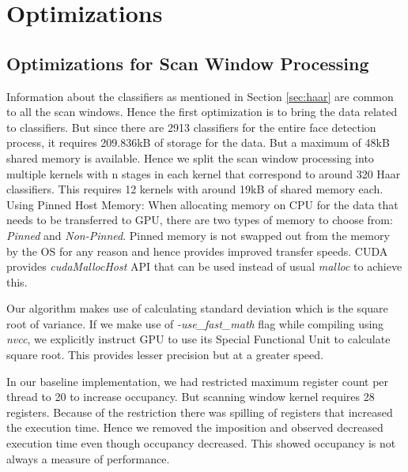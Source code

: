 \section{Optimizations}\label{sec:optim}

\subsection{Optimizations for Scan Window Processing}
\begin{itemize}

Information about the classifiers as mentioned in Section
\ref{sec:haar} are common to all the scan windows. Hence the first optimization 
is to bring the data related to classifiers. But since there are 2913 classifiers 
for the entire face detection process, it requires 209.836kB of storage for the data. 
But a maximum of 48kB shared memory is available. Hence we split the scan window processing 
into multiple kernels with n stages in each kernel that correspond to around 320 Haar classifiers. 
This requires 12 kernels with around 19kB of shared memory each.
Using Pinned Host Memory: When allocating memory on CPU for the data that needs to be transferred 
to GPU, there are two types of memory to choose from: \emph{Pinned} and \emph{Non-Pinned}. 
Pinned memory is not swapped out from the memory by the OS for any reason and hence provides 
improved transfer speeds. CUDA provides \emph{cudaMallocHost} API that can be used instead of 
usual \emph{malloc} to achieve this.

Our algorithm makes use of calculating standard deviation which is the square 
root of variance. If we make use of \emph{-use\_fast\_math} flag while compiling using \emph{nvcc}, 
we explicitly instruct GPU to use its Special Functional Unit to calculate square root. This provides 
lesser precision but at a greater speed. 

In our baseline implementation, we had 
restricted maximum register count per thread to 20 to increase occupancy. But scanning window 
kernel requires 28 registers. Because of the restriction there was spilling of registers that 
increased the execution time. Hence we removed the imposition and observed decreased execution 
time even though occupancy decreased. This showed occupancy is not always a measure of performance.


\end{itemize}
